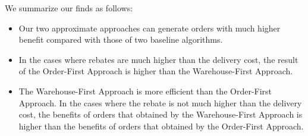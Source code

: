 \fi

We summarize our finds as follows:

\begin{itemize}
	\item Our two approximate approaches can generate orders with much higher benefit compared with those of two baseline algorithms.
	\item In the cases where rebates are much higher than the delivery cost, the result of the Order-First Approach is higher than the Warehouse-First Approach.
	\item The Warehouse-First Approach is more efficient than the Order-First Approach. In the cases where the rebate is not much higher than the delivery cost, the benefits of orders that obtained by the Warehouse-First Approach is higher than the benefits of orders that obtained by the Order-First Approach.
\end{itemize}

\vspace{-1ex}